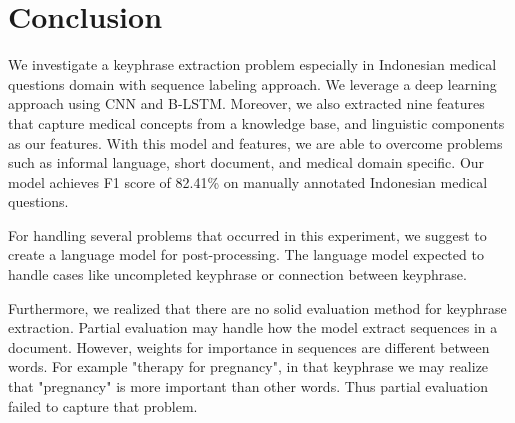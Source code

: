 \section{Conclusion}
We investigate a keyphrase extraction problem especially in Indonesian medical questions domain with sequence labeling approach. We leverage a deep learning approach using CNN and B-LSTM. Moreover, we also extracted nine features that capture medical concepts from a knowledge base, and linguistic components as our features. With this model and features, we are able to overcome problems such as informal language, short document, and medical domain specific. Our model achieves F1 score of 82.41\% on manually annotated Indonesian medical questions.

For handling several problems that occurred in this experiment, we suggest to create a language model for post-processing. The language model expected to handle cases like uncompleted keyphrase or connection between keyphrase.

Furthermore, we realized that there are no solid evaluation method for keyphrase extraction. Partial evaluation may handle how the model extract sequences in a document. However, weights for importance in sequences are different between words. For example "therapy for pregnancy", in that keyphrase we may realize that "pregnancy" is more important than other words. Thus partial evaluation failed to capture that problem.
